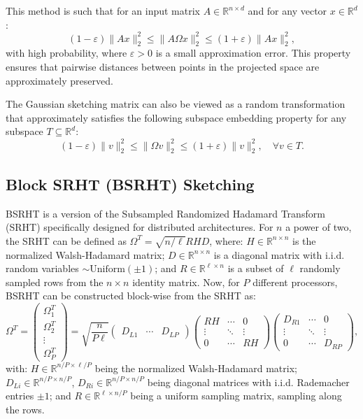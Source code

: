 \documentclass[a4paper, 12pt,oneside]{article}
\begin{document}
	This method is such that for an input matrix $A \in \mathbb{R}^{n \times d}$ and for any vector $x \in \mathbb{R}^d$:
	\[
	(1 - \varepsilon)\|A x\|_2^2 \leq \|A \Omega x\|_2^2 \leq (1 + \varepsilon)\|A x\|_2^2,
	\]
	with high probability, where $\varepsilon > 0$ is a small approximation error. This property ensures that pairwise distances between points in the projected space are approximately preserved.

	The Gaussian sketching matrix can also be viewed as a random transformation that approximately satisfies the following subspace embedding property for any subspace $T \subseteq \mathbb{R}^d$:
	\[
	(1 - \varepsilon) \|v\|_2^2 \leq \|\Omega v\|_2^2 \leq (1 + \varepsilon) \|v\|_2^2, \quad \forall v \in T.
	\]
	\subsection{Block SRHT (BSRHT) Sketching}
	BSRHT is a version of the Subsampled Randomized Hadamard Transform (SRHT) specifically designed for distributed architectures. For $n$ a power of two, the SRHT can be defined as $\Omega^T = \sqrt{n/ \ell} RHD$, where: $H \in \mathbb{R}^{n \times n}$ is the normalized Walsh-Hadamard matrix; $D \in \mathbb{R}^{n \times n}$ is a diagonal matrix with i.i.d. random variables $\sim \text{Uniform}(\pm 1)$; and $R \in \mathbb{R}^{\ell \times n}$ is a subset of $\ell$ randomly sampled rows from the $n \times n$ identity matrix. Now, for $P$ different processors, BSRHT can be constructed block-wise from the SRHT as:
	\[
	\Omega^T = \begin{pmatrix} \Omega_1^T \\
	\Omega_2^T \\
	\vdots \\
	\Omega_P^T \end{pmatrix} = \sqrt{\frac{n}{P\ell}} \begin{pmatrix} D_{L1} & \cdots & D_{LP} \end{pmatrix}
	\begin{pmatrix}
	RH & \cdots & 0 \\
	\vdots & \ddots & \vdots \\
	0 & \cdots & RH
	\end{pmatrix}
	\begin{pmatrix} D_{R1} & \cdots & 0 \\
	\vdots & \ddots & \vdots \\
	0 & \cdots & D_{RP} \end{pmatrix}, \tag{2}
	\]
	with: $H \in \mathbb{R}^{n/P \times \ell/P}$ being the normalized Walsh-Hadamard matrix; $D_{Li} \in \mathbb{R}^{n/P \times n/P}$, $D_{Ri} \in \mathbb{R}^{n/P \times n/P}$ being diagonal matrices with i.i.d. Rademacher entries $\pm 1$; and $R \in \mathbb{R}^{\ell \times n/P}$ being a uniform sampling matrix, sampling along the rows.
\end{document}

